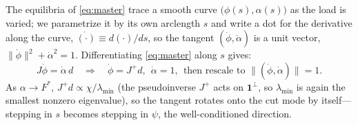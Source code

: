 \documentclass{siamart220329}
\begin{document}
The equilibria of \eqref{eq:master} trace a smooth curve $\big(\phi(s),\alpha(s)\big)$ as the load is
varied; we parametrize it by its own arclength $s$ and write a dot for the derivative along the
curve, $\dot{(\cdot)}\equiv d(\cdot)/ds$, so the tangent $(\dot\phi,\dot\alpha)$ is a unit
vector, $\|\dot\phi\|^2+\dot\alpha^2=1$. Differentiating \eqref{eq:master} along $s$ gives:
\begin{equation}\label{eq:tangent}
J\dot\phi=\dot\alpha\,d\quad\Longrightarrow\quad \dot\phi=J^{+}d,\ \ \dot\alpha=1,\ \ \text{then rescale to }\|(\dot\phi,\dot\alpha)\|=1 .
\end{equation}
As $\alpha\to F^*$, $J^{+}d\propto\chi/\lambda_{\min}$ (the pseudoinverse $J^{+}$ acts on
$\mathbf 1^{\perp}$, so $\lambda_{\min}$ is again the smallest nonzero eigenvalue), so the tangent
rotates onto the cut mode by
itself---stepping in $s$ becomes stepping in $\psi$, the well-conditioned direction.
\end{document}
